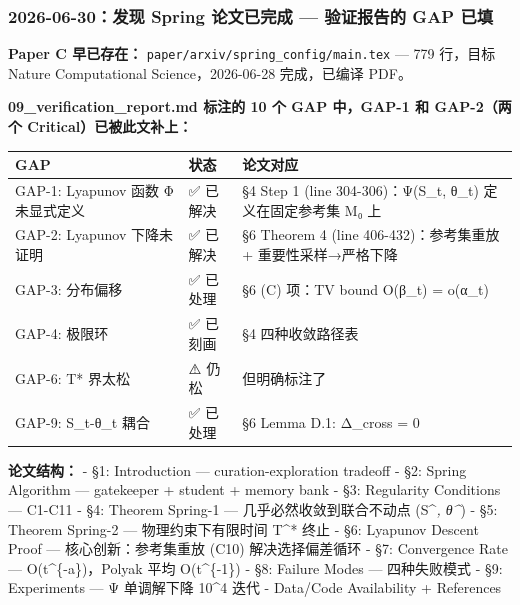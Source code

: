\documentclass[
  12pt,
]{ctexart}
\begin{document}
\subsubsection{2026-06-30：发现 Spring 论文已完成 --- 验证报告的 GAP
已填}\label{ux53d1ux73b0-spring-ux8bbaux6587ux5df2ux5b8cux6210-ux9a8cux8bc1ux62a5ux544aux7684-gap-ux5df2ux586b}

\textbf{Paper C 早已存在：} \texttt{paper/arxiv/spring\_config/main.tex}
--- 779 行，目标 Nature Computational Science，2026-06-28 完成，已编译
PDF。

\textbf{09\_verification\_report.md 标注的 10 个 GAP 中，GAP-1 和
GAP-2（两个 Critical）已被此文补上：}

\begin{longtable}[]{@{}
  >{\raggedright\arraybackslash}p{}
  >{\raggedright\arraybackslash}p{}
  >{\raggedright\arraybackslash}p{}@{}}
\toprule\noalign{}
\begin{minipage}[b]{\linewidth}\raggedright
GAP
\end{minipage} & \begin{minipage}[b]{\linewidth}\raggedright
状态
\end{minipage} & \begin{minipage}[b]{\linewidth}\raggedright
论文对应
\end{minipage} \\
\midrule\noalign{}
\endhead
\bottomrule\noalign{}
\endlastfoot
GAP-1: Lyapunov 函数 Φ 未显式定义 & ✅ 已解决 & §4 Step 1 (line
304-306)：Ψ(S\_t, θ\_t) 定义在固定参考集 M₀ 上 \\
GAP-2: Lyapunov 下降未证明 & ✅ 已解决 & §6 Theorem 4 (line
406-432)：参考集重放 + 重要性采样→严格下降 \\
GAP-3: 分布偏移 & ✅ 已处理 & §6 (C) 项：TV bound O(β\_t) = o(α\_t) \\
GAP-4: 极限环 & ✅ 已刻画 & §4 四种收敛路径表 \\
GAP-6: T* 界太松 & ⚠️ 仍松 & 但明确标注了 \\
GAP-9: S\_t-θ\_t 耦合 & ✅ 已处理 & §6 Lemma D.1: Δ\_cross = 0 \\
\end{longtable}

\textbf{论文结构：} - §1: Introduction --- curation-exploration tradeoff
- §2: Spring Algorithm --- gatekeeper + student + memory bank - §3:
Regularity Conditions --- C1-C11 - §4: Theorem Spring-1 ---
几乎必然收敛到联合不动点 (S\^{}\emph{, θ\^{}}) - §5: Theorem Spring-2
--- 物理约束下有限时间 T\^{}* 终止 - §6: Lyapunov Descent Proof ---
核心创新：参考集重放 (C10) 解决选择偏差循环 - §7: Convergence Rate ---
O(t\^{}\{-a\})，Polyak 平均 O(t\^{}\{-1\}) - §8: Failure Modes ---
四种失败模式 - §9: Experiments --- Ψ 单调解下降 10\^{}4 迭代 - Data/Code
Availability + References
\end{document}
